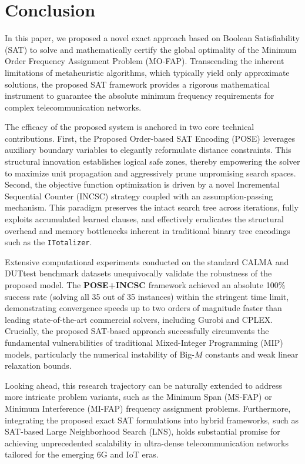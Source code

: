 \documentclass[letterpaper,journal]{IEEEtran}
\begin{document}


\section{Conclusion}
\label{sec:conclusion}

In this paper, we proposed a novel exact approach based on Boolean Satisfiability (SAT) to solve and mathematically certify the global optimality of the Minimum Order Frequency Assignment Problem (MO-FAP). Transcending the inherent limitations of metaheuristic algorithms, which typically yield only approximate solutions, the proposed SAT framework provides a rigorous mathematical instrument to guarantee the absolute minimum frequency requirements for complex telecommunication networks.

The efficacy of the proposed system is anchored in two core technical contributions. First, the Proposed Order-based SAT Encoding (POSE) leverages auxiliary boundary variables to elegantly reformulate distance constraints. This structural innovation establishes logical safe zones, thereby empowering the solver to maximize unit propagation and aggressively prune unpromising search spaces. Second, the objective function optimization is driven by a novel Incremental Sequential Counter (INCSC) strategy coupled with an assumption-passing mechanism. This paradigm preserves the intact search tree across iterations, fully exploits accumulated learned clauses, and effectively eradicates the structural overhead and memory bottlenecks inherent in traditional binary tree encodings such as the \texttt{ITotalizer}.

Extensive computational experiments conducted on the standard CALMA and DUTtest benchmark datasets unequivocally validate the robustness of the proposed model. The \textbf{POSE+INCSC} framework achieved an absolute 100\% success rate (solving all 35 out of 35 instances) within the stringent time limit, demonstrating convergence speeds up to two orders of magnitude faster than leading state-of-the-art commercial solvers, including Gurobi and CPLEX. Crucially, the proposed SAT-based approach successfully circumvents the fundamental vulnerabilities of traditional Mixed-Integer Programming (MIP) models, particularly the numerical instability of Big-$M$ constants and weak linear relaxation bounds.

Looking ahead, this research trajectory can be naturally extended to address more intricate problem variants, such as the Minimum Span (MS-FAP) or Minimum Interference (MI-FAP) frequency assignment problems. Furthermore, integrating the proposed exact SAT formulations into hybrid frameworks, such as SAT-based Large Neighborhood Search (LNS), holds substantial promise for achieving unprecedented scalability in ultra-dense telecommunication networks tailored for the emerging 6G and IoT eras.
\end{document}
